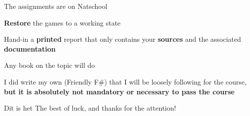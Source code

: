 \documentclass{beamer}
\begin{document}
\begin{slide}{
\item The assignments are on Natschool
\item \textbf{Restore} the games to a working state
\item Hand-in a \textbf{printed} report that only contains your \textbf{sources} and the associated \textbf{documentation}
}\end{slide}

\begin{slide}{
\item Any book on the topic will do
\item I did write my own (Friendly F\#) that I will be loosely following for the course, \textbf{but it is absolutely not mandatory or necessary to pass the course}
}\end{slide}


\begin{frame}{Dit is het}
\center
\fontsize{18pt}{7.2}\selectfont
The best of luck, and thanks for the attention!
\end{frame}
\end{document}

